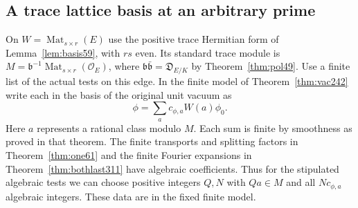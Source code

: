 \documentclass[a4paper,11pt]{article}
\theoremstyle{definition}
\theoremstyle{remark}
\numberwithin{equation}{section}
\newcommand{\OO}{\mathcal O}
\begin{document}
\subsection{A trace lattice basis at an arbitrary prime}\label{nav:VIII-62}
On \(W=\operatorname{Mat}_{s\times r}(E)\) use the positive
trace Hermitian form of Lemma~\ref{lem:basis59}, with \(rs\)
even. Its standard trace module is
\(M=\mathfrak b^{-1}\operatorname{Mat}_{s\times r}(\OO_E)\),
where \(\mathfrak b\bar{\mathfrak b}=\mathfrak D_{E/K}\) by
Theorem~\ref{thm:pol49}. Use a finite list of the actual tests
on this edge. In the finite model of Theorem~\ref{thm:vac242}
write each in the basis of the original unit vacuum as
\[
           \phi=\sum_a c_{\phi,a} W(a)\phi_0 .
\]
Here \(a\) represents a rational class modulo \(M\).
Each sum is finite by smoothness as proved in that theorem.
The finite transports and splitting factors in
Theorem~\ref{thm:one61} and the finite Fourier expansions in
Theorem~\ref{thm:bothlast311} have algebraic coefficients.
Thus for the stipulated algebraic tests we can choose positive
integers \(Q,N\) with \(Qa\in M\) and all \(Nc_{\phi,a}\)
algebraic integers. These data are in the fixed finite model.
\end{document}
